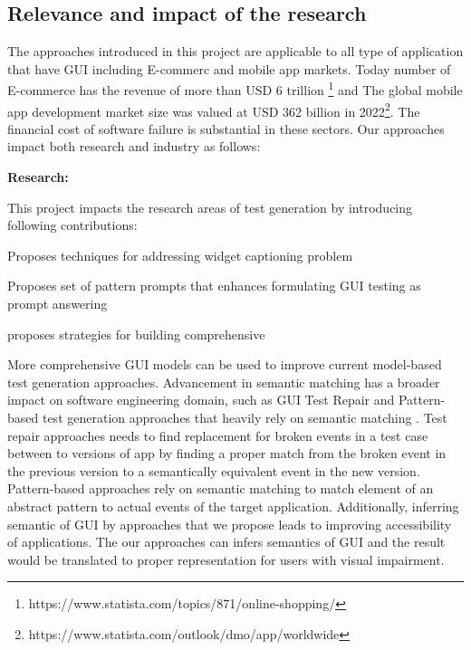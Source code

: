 \subsection{Relevance and impact of the research }


The approaches introduced in this project are applicable to all type of application that have GUI including E-commerc and mobile app markets.
Today number of E-commerce has the revenue of more than USD 6 trillion \footnote{https://www.statista.com/topics/871/online-shopping/} and 
The global mobile app development market size was valued at USD 362 billion in 2022\footnote{https://www.statista.com/outlook/dmo/app/worldwide}.
The financial cost of software failure is substantial in these sectors. 
Our approaches impact both research and industry as follows:




\smallskip
\noindent
\textbf{Research:}

\noindent
This project impacts the research areas of test generation by introducing following contributions:
\begin{inparaenum}[(i)]
\item Proposes techniques for addressing widget captioning problem
\item Proposes set of pattern prompts that enhances formulating GUI testing  as prompt answering
\item proposes strategies for building comprehensive \tam
\end{inparaenum}
More comprehensive GUI models can be used to improve current model-based test generation approaches.
Advancement in semantic matching has a broader impact on software engineering domain, such as GUI Test Repair and Pattern-based test generation approaches that heavily rely on semantic matching .
Test repair approaches needs to find replacement for broken events in a test case between to versions of app by finding a proper match from the broken event in the previous version to a semantically equivalent event in the new version.
Pattern-based approaches rely on semantic matching to match element of an abstract pattern to actual events of the target application.
Additionally, inferring semantic of GUI by approaches that we propose leads to improving accessibility of applications.
The our approaches can infers semantics of GUI and the result would be translated to proper representation for users with visual impairment.  


